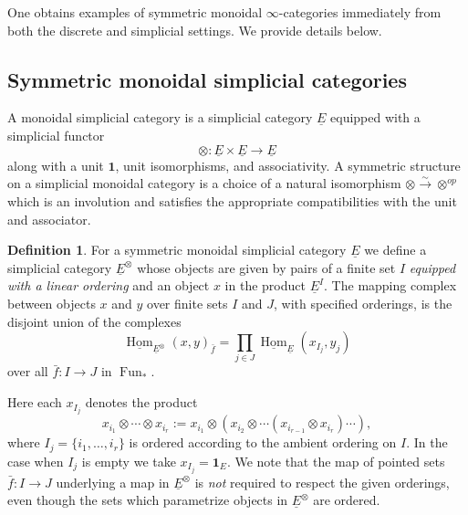 \documentclass[reqno]{amsart}
\theoremstyle{definition}
\newtheorem{definition}[lemma]{Definition}
\newcommand{\ot}{\otimes}
\newcommand{\uHom}{\underline{\operatorname{Hom}}}
\DeclareMathOperator{\Fun}{Fun}
\renewcommand{\1}{\mathbf{1}}
\begin{document}
One obtains examples of symmetric monoidal $\infty$-categories immediately from both the discrete and simplicial settings.  We provide details below.

\subsection{Symmetric monoidal simplicial categories}

A monoidal simplicial category is a simplicial category $\underline{E}$ equipped with a simplicial functor
\[
\ot:\underline{E}\times\underline{E}\to \underline{E}
\]
along with a unit $\1$, unit isomorphisms, and associativity.  A symmetric structure on a simplicial monoidal category is a choice of a natural isomorphism $\ot\overset{\sim}\to \ot^{op}$ which is an involution and satisfies the appropriate compatibilities with the unit and associator.

\begin{definition}\label{def:e_ot}
For a symmetric monoidal simplicial category $\underline{E}$ we define a simplicial category $\underline{E}^{\ot}$ whose objects are given by pairs of a finite set $I$ \emph{equipped with a linear ordering} and an object $x$ in the product $\underline{E}^I$.  The mapping complex between objects $x$ and $y$ over finite sets $I$ and $J$, with specified orderings, is the disjoint union of the complexes
\begin{equation}\label{eq:128}
\uHom_{\underline{E}^{\ot}}(x,y)_{\bar{f}}=\prod_{j\in J}\uHom_{\underline{E}}(x_{I_j},y_j)
\end{equation}
over all $\bar{f}:I\to J$ in $\Fun_\ast$.
\end{definition}

Here each $x_{I_j}$ denotes the product
\[
x_{i_1}\ot\cdots \ot x_{i_r}:=x_{i_1}\ot(x_{i_2}\ot\cdots(x_{i_{r-1}}\ot x_{i_r})\cdots),
\]
where $I_j=\{i_1,\dots,i_r\}$ is ordered according to the ambient ordering on $I$. In the case when $I_j$ is empty we take $x_{I_j}=\1_{E}$. We note that the map of pointed sets $\bar{f}:I\to J$ underlying a map in $\underline{E}^{\ot}$ is \emph{not} required to respect the given orderings, even though the sets which parametrize objects in $\underline{E}^{\ot}$ are ordered.
\par
\end{document}
